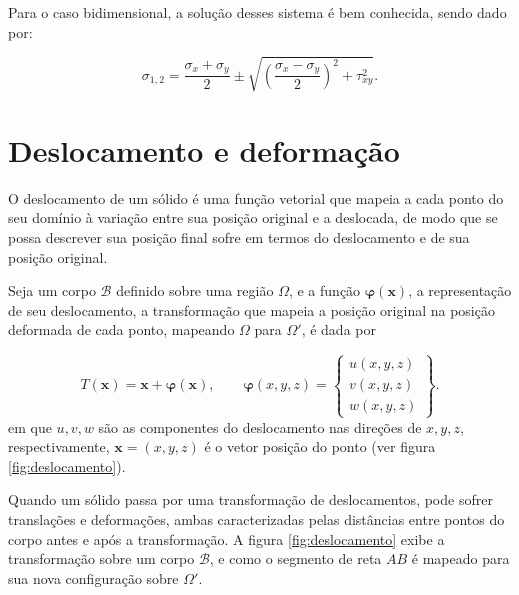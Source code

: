 Para o caso bidimensional, a solução desses sistema é bem conhecida, sendo dado por:

\begin{equation}
    \sigma_{1,2} = \frac{\sigma_x + \sigma_y}{2} \pm \sqrt{\left(\frac{\sigma_x - \sigma_y}{2}\right)^2 + \tau_{xy}^2}.
\end{equation}

\section{Deslocamento e deformação}

O deslocamento de um sólido é uma função vetorial que mapeia a cada ponto do seu domínio à variação entre sua posição original e a deslocada, de modo que se possa descrever sua posição final sofre em termos do deslocamento e de sua posição original. 

Seja um corpo $\mathcal{B}$ definido sobre uma região $\Omega$, e a função $\bm{\varphi}(\bm{x})$, a representação de seu deslocamento, a transformação que mapeia a posição original na posição deformada de cada ponto, mapeando $\Omega$ para $\Omega'$, é dada por

\begin{equation}
    T(\bm{x}) = \bm{x} + \bm{\varphi}(\bm{x}), \qquad
    \bm{\varphi}(x,y,z) = \begin{Bmatrix}
        u(x,y,z) \\ v(x,y,z) \\ w(x,y,z) 
    \end{Bmatrix}.
    \label{eq:transformacao}
\end{equation}
em que $u, v, w$ são as componentes do deslocamento nas direções de $x, y, z$, respectivamente,  $\bm{x} = (x,y,z)$ é o vetor posição do ponto (ver figura \ref{fig:deslocamento}).



Quando um sólido passa por uma transformação de deslocamentos, pode sofrer translações e deformações, ambas caracterizadas pelas distâncias entre pontos do corpo antes e após a transformação. A figura \ref{fig:deslocamento} exibe a transformação sobre um corpo $\mathcal{B}$, e como o segmento de reta $AB$ é mapeado para sua nova configuração sobre $\Omega'$.

